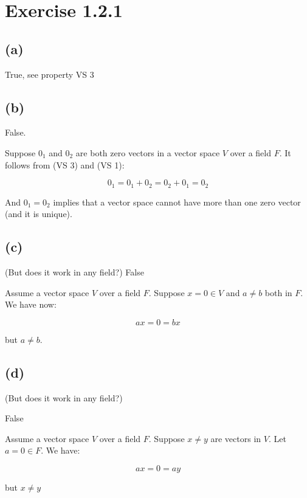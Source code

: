 \documentclass{article}
\begin{document}
\section*{Exercise 1.2.1}

\subsection*{(a)}

True, see property VS 3

\subsection*{(b)}

False.

Suppose \(0_{1}\) and \(0_{2}\) are both zero vectors in a vector space \(V\) over a field \(F\). It follows from (VS 3) and (VS 1):

\begin{equation*}
    0_{1} = 0_{1} + 0_{2} = 0_{2} + 0_{1} = 0_{2}
\end{equation*}

And \(0_{1} = 0_{2}\) implies that a vector space cannot have more than one zero vector
(and it is unique).

\subsection*{(c)}
(But does it work in any field?)
False

Assume a vector space \(V\) over a field \(F\). Suppose \(x = 0 \in V\) and
\(a \neq b\) both in \(F\). We have now:

\begin{equation*}
    ax = 0 = bx 
\end{equation*}

but \(a \neq b\).

\subsection*{(d)}
(But does it work in any field?)

False

Assume a vector space \(V\) over a field \(F\). Suppose \(x \neq y\) are vectors
in \(V\). Let \(a = 0 \in F\). We have:

\begin{equation*}
    ax = 0 = ay
\end{equation*}

but \(x \neq y\)
\end{document}
